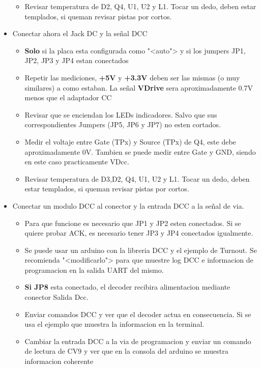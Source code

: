 \begin{itemize}
\begin{itemize}
\item Revisar temperatura de D2, Q4, U1, U2 y L1. Tocar un dedo, deben estar templados, si queman revisar pistas por cortos.

	\end{itemize}
\item Conectar ahora el Jack DC y la señal DCC
	\begin{itemize}
		\item \textbf{Solo} si la placa esta configurada como "<auto"> y si los jumpers JP1, JP2, JP3 y JP4 estan conectados

\item Repetir las mediciones, \textbf{+5V} y \textbf{+3.3V} deben ser las mismas (o muy similares) a como estaban. La señal \textbf{VDrive} sera aproximadamente 0.7V menos que el adaptador CC

\item Revisar que se enciendan los LEDs indicadores. Salvo que sus correspondientes Jumpers (JP5, JP6 y JP7) no esten cortados.
\item Medir el voltaje entre Gate (TPx) y Source (TPx) de Q4, este debe aproximadamente 0V. Tambien se puede medir entre Gate y GND, siendo en este caso practicamente VDcc.

\item Revisar temperatura de D3,D2, Q4, U1, U2 y L1. Tocar un dedo, deben estar templados, si queman revisar pistas por cortos.

	\end{itemize}

\item Conectar un modulo DCC al conector y la entrada DCC a la señal de via.
\begin{itemize}
\item  Para que funcione es necesario que JP1 y JP2 esten conectados. Si se quiere probar ACK, es necesario tener JP3 y JP4 conectados igualmente.
\item Se puede usar un arduino con la libreria DCC y el ejemplo de Turnout. Se recomienda "<modificarlo"> para que muestre log DCC e informacion de programacion en la salida UART del mismo.
\item \textbf{Si JP8} esta conectado, el decoder recibira alimentacion mediante conector Salida Dcc.
\item Enviar comandos DCC y ver que el decoder actua en consecuencia. Si se usa el ejemplo que muestra la informacion en la terminal.
\item Cambiar la entrada DCC a la via de programacion y enviar un comando de lectura de CV9 y ver que en la consola del arduino se muestra informacion coherente 

\end{itemize}

\end{itemize}
